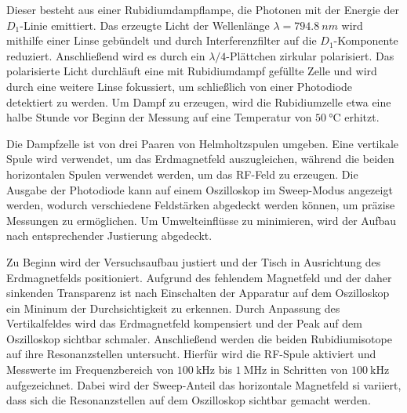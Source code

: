 Dieser besteht aus einer Rubidiumdampflampe, die Photonen mit der Energie der $D_1$-Linie emittiert. 
Das erzeugte Licht der Wellenlänge $\lambda = \qty{794.8}{nm}$ wird mithilfe einer Linse gebündelt und 
durch Interferenzfilter auf die $D_1$-Komponente reduziert. 
Anschließend wird es durch ein $\lambda/4$-Plättchen zirkular polarisiert. 
Das polarisierte Licht durchläuft eine mit Rubidiumdampf gefüllte Zelle
und wird durch eine weitere Linse fokussiert, um schließlich von einer Photodiode detektiert zu werden. 
Um Dampf zu erzeugen, wird die Rubidiumzelle etwa eine halbe Stunde vor Beginn der Messung auf eine Temperatur von $\SI{50}{\celsius}$ erhitzt.

Die Dampfzelle ist von drei Paaren von Helmholtzspulen umgeben. 
Eine vertikale Spule wird verwendet, um das Erdmagnetfeld auszugleichen, 
während die beiden horizontalen Spulen verwendet werden, um das RF-Feld zu erzeugen. 
Die Ausgabe der Photodiode kann auf einem Oszilloskop im Sweep-Modus angezeigt werden, 
wodurch verschiedene Feldstärken abgedeckt werden können, um präzise Messungen zu ermöglichen. 
Um Umwelteinflüsse zu minimieren, wird der Aufbau nach entsprechender Justierung abgedeckt.

Zu Beginn wird der Versuchsaufbau justiert und der Tisch in Ausrichtung des Erdmagnetfelds positioniert. 
Aufgrund des fehlendem Magnetfeld und der daher sinkenden Transparenz
ist nach Einschalten der Apparatur auf dem Oszilloskop ein Mininum der Durchsichtigkeit zu erkennen.
Durch Anpassung des Vertikalfeldes wird das Erdmagnetfeld kompensiert und der Peak auf dem Oszilloskop sichtbar schmaler. 
Anschließend werden die beiden Rubidiumisotope auf ihre Resonanzstellen untersucht. 
Hierfür wird die RF-Spule aktiviert und Messwerte im Frequenzbereich 
von $\SI{100}{\kilo\hertz}$ bis $\SI{1}{\mega\hertz}$ in Schritten von $\SI{100}{\kilo\hertz}$ aufgezeichnet.
Dabei wird der Sweep-Anteil das horizontale Magnetfeld si variiert,
dass sich die Resonanzstellen auf dem Oszilloskop sichtbar gemacht werden.

